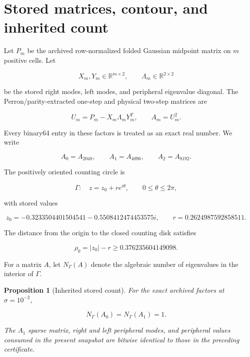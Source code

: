 \documentclass[11pt]{article}
\newtheorem{proposition}[theorem]{Proposition}
\theoremstyle{definition}
\theoremstyle{remark}
\newcommand{\GammaC}{\Gamma}
\begin{document}
\section{Stored matrices, contour, and inherited count}
\label{sec:objects}

Let $P_m$ be the archived row-normalized folded Gaussian midpoint matrix on
$m$ positive cells.  Let

\[
X_m,Y_m\in\mathbb R^{m\times2},\qquad
\Lambda_m\in\mathbb R^{2\times2}
\]

be the stored right modes, left modes, and peripheral eigenvalue diagonal.
The Perron/parity-extracted one-step and physical two-step matrices are

\begin{equation}
 U_m=P_m-X_m\Lambda_mY_m^T,
 \qquad A_m=U_m^2.
 \label{eq:physical}
\end{equation}

Every binary64 entry in these factors is treated as an exact real number.  We
write

\[
A_0=A_{2048},\qquad A_1=A_{4096},\qquad A_2=A_{8192}.
\]

The positively oriented counting circle is

\begin{equation}
 \GammaC:\quad z=z_0+r e^{i\theta},\qquad 0\le\theta\le2\pi,
 \label{eq:contour}
\end{equation}

with stored values

\begin{equation}
 z_0=-0.3233504401504541-0.5508412474453575i,
 \qquad r=0.2624987592858511.
 \label{eq:contour-values}
\end{equation}

The distance from the origin to the closed counting disk satisfies

\begin{equation}
 \rho_0=|z_0|-r\ge0.376235604149098.
 \label{eq:origin-distance}
\end{equation}

For a matrix $A$, let $N_{\Gamma}(A)$ denote the algebraic number of
eigenvalues in the interior of \(\Gamma\).

\begin{proposition}[Inherited stored count]
\label{prop:inherited}
For the exact archived factors at \(\sigma=10^{-2}\),

\[
N_{\Gamma}(A_0)=N_{\Gamma}(A_1)=1.
\]

The $A_1$ sparse matrix, right and left peripheral modes, and peripheral
values consumed in the present snapshot are bitwise identical to those in
the preceding certificate.
\end{proposition}
\end{document}
